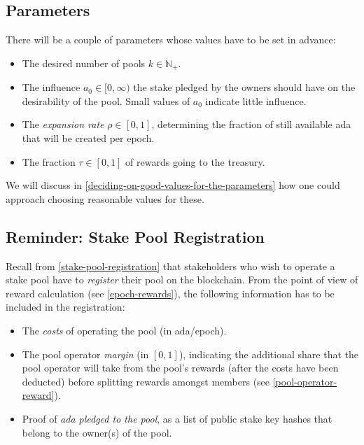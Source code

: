 \documentclass[11pt,a4paper]{article}
\begin{document}
\subsection{Parameters}
\label{parameters}

There will be a couple of parameters whose values have to be set in
advance:

\begin{itemize}
\item
  The desired number of pools \(k\in\mathbb{N}_+\).
\item
  The influence \(a_0\in[0,\infty)\) the stake pledged by the owners should have
    on the desirability of the pool. Small values of \(a_0\) indicate little
    influence.
\item
  The \emph{expansion rate} \(\rho\in[0,1]\), determining the fraction
  of still available ada that will be created per epoch.
\item
  The fraction \(\tau\in[0,1]\) of rewards going to the treasury.
\end{itemize}

We will discuss
in \cref{deciding-on-good-values-for-the-parameters} how one
could approach choosing reasonable values for these.

\subsection{Reminder: Stake Pool Registration}
\label{reminder-stake-pool-registration}

Recall from \cref{stake-pool-registration} that stakeholders
who wish to operate a stake pool have to \emph{register} their
pool on the blockchain. From the point of view of reward calculation
(see \cref{epoch-rewards}), the following information has to
be included in the registration:

\begin{itemize}
\item
  The \emph{costs} of operating the pool (in ada/epoch).
\item
  The pool operator \emph{margin} (in \([0,1]\)), indicating the additional
  share that the pool operator will take from the pool's rewards (after the
  costs have been deducted) before splitting rewards amongst members (see
  \cref{pool-operator-reward}).
\item
  Proof of \emph{ada pledged to the pool}, as a list of public stake
  key hashes that belong to the owner(s) of the pool.
\end{itemize}
\end{document}
